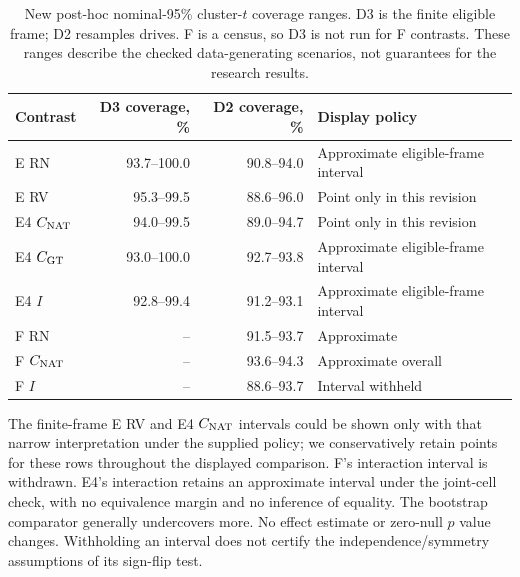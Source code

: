 \begin{table}[ht]
\centering\small
\caption{New post-hoc nominal-95\% cluster-$t$ coverage ranges. D3 is the finite eligible frame; D2 resamples drives. F is a census, so D3 is not run for F contrasts. These ranges describe the checked data-generating scenarios, not guarantees for the research results.}
\label{tab:coverage_new}
\begin{tabular}{@{}lrrl@{}}\toprule
Contrast & D3 coverage, \% & D2 coverage, \% & Display policy\\\midrule
E RN & 93.7--100.0 & 90.8--94.0 & Approximate eligible-frame interval\\
E RV & 95.3--99.5 & 88.6--96.0 & Point only in this revision\\
E4 $C_{\mathrm{NAT}}$ & 94.0--99.5 & 89.0--94.7 & Point only in this revision\\
E4 $C_{\mathrm{GT}}$ & 93.0--100.0 & 92.7--93.8 & Approximate eligible-frame interval\\
E4 $I$ & 92.8--99.4 & 91.2--93.1 & Approximate eligible-frame interval\\
F RN & -- & 91.5--93.7 & Approximate\\
F $C_{\mathrm{NAT}}$ & -- & 93.6--94.3 & Approximate overall\\
F $I$ & -- & 88.6--93.7 & Interval withheld\\\bottomrule
\end{tabular}
\end{table}

The finite-frame E RV and E4 $C_{\mathrm{NAT}}$ intervals could be shown only with that narrow interpretation under the supplied policy; we conservatively retain points for these rows throughout the displayed comparison. F's interaction interval is withdrawn. E4's interaction retains an approximate interval under the joint-cell check, with no equivalence margin and no inference of equality. The bootstrap comparator generally undercovers more. No effect estimate or zero-null $p$ value changes. Withholding an interval does not certify the independence/symmetry assumptions of its sign-flip test.

